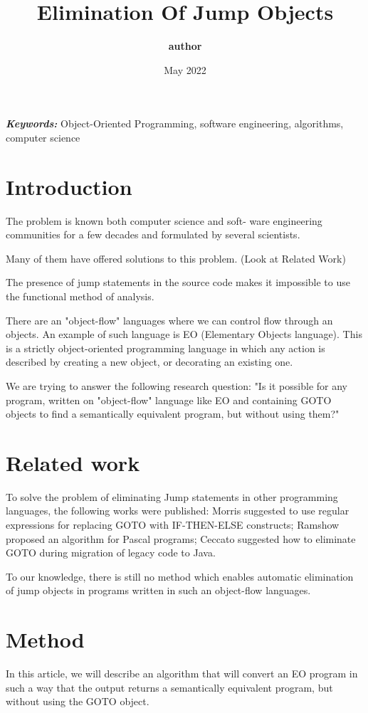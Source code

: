 \documentclass[sigplan,review,11pt,nonacm,natbib=false]{acmart}
\title{\textbf{Elimination Of Jump Objects}}
\author{\textbf{author}}
\date{May 2022}
\providecommand{\keywords}[1]
{
  \small
  \textbf{\textit{Keywords:}} #1
}
\begin{document}
\maketitle


\keywords{Object-Oriented Programming, software engineering, algorithms, computer science}

\section{Introduction}
The problem is known both computer science and soft-
ware engineering communities for a few decades and formulated by several scientists.

Many of them have offered solutions to this problem. (Look at Related Work)

The presence of jump statements in the source code makes it impossible to use the functional method of analysis.

There are an "object-flow" languages where we can control flow through an objects. An example of such language is EO (Elementary Objects language). This is a strictly object-oriented programming language in which any action is described by creating a new object, or decorating an existing one.

We are trying to answer the following research question: "Is it possible for any program, written on "object-flow" language like EO and containing GOTO objects to find a semantically equivalent program, but without using them?"

\section{Related work}
To solve the problem of eliminating Jump statements in other programming languages, the following works were published:
Morris suggested to use regular expressions for replacing GOTO with IF-THEN-ELSE constructs;
Ramshow proposed an algorithm for Pascal programs;
Ceccato suggested how to eliminate GOTO during migration of legacy code to Java.

To our knowledge, there is still no method which enables automatic elimination of jump objects in programs written in such an object-flow languages.

\section{Method}
In this article, we will describe an algorithm that will convert an EO program in such a way that the output returns a semantically equivalent program, but without using the GOTO object.
\end{document}
